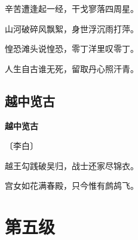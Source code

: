 \documentclass[12pt,UTF-8,openany,fontset=none]{ctexbook}
\begin{document}
    \vspace{18pt}  %

\begin{center}
    \begin{Large}

        辛苦遭逢起一经，干戈寥落四周星。

        山河破碎风飘絮，身世浮沉雨打萍。

        惶恐滩头说惶恐，零丁洋里叹零丁。

        人生自古谁无死，留取丹心照汗青。

    \end{Large}

\end{center}

\vspace{8pt}
\clearpage

\section{越中览古}


\begin{center}
    {\bfseries 越中览古}

    \vspace{18pt}

    \begin{large}\xuwen
        〔李白〕
    \end{large}

\end{center}

    \vspace{18pt}  %

\begin{center}
    \begin{Large}

        越王勾践破吴归，战士还家尽锦衣。

        宫女如花满春殿，只今惟有鹧鸪飞。

    \end{Large}

\end{center}

\vspace{8pt}
\clearpage

\chapter{第五级}
\clearpage
\end{document}
